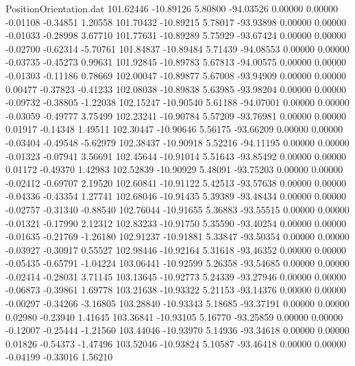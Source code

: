\begin{filecontents}{PositionOrientation.dat}
 101.62446  -10.89126    5.80800   -94.03526    0.00000    0.00000   -0.01108   -0.34851    1.20558
 101.70432  -10.89215    5.78017   -93.93898    0.00000    0.00000   -0.01033   -0.28998    3.67710
 101.77631  -10.89289    5.75929   -93.67424    0.00000    0.00000   -0.02700   -0.62314   -5.70761
 101.84837  -10.89484    5.71439   -94.08553    0.00000    0.00000   -0.03735   -0.45273    0.99631
 101.92845  -10.89783    5.67813   -94.00575    0.00000    0.00000   -0.01303   -0.11186    0.78669
 102.00047  -10.89877    5.67008   -93.94909    0.00000    0.00000    0.00477   -0.37823   -0.41233
 102.08038  -10.89838    5.63985   -93.98204    0.00000    0.00000   -0.09732   -0.38805   -1.22038
 102.15247  -10.90540    5.61188   -94.07001    0.00000    0.00000   -0.03059   -0.49777    3.75499
 102.23241  -10.90784    5.57209   -93.76981    0.00000    0.00000    0.01917   -0.14348    1.49511
 102.30447  -10.90646    5.56175   -93.66209    0.00000    0.00000   -0.03404   -0.49548   -5.62979
 102.38437  -10.90918    5.52216   -94.11195    0.00000    0.00000   -0.01323   -0.07941    3.56691
 102.45644  -10.91014    5.51643   -93.85492    0.00000    0.00000    0.01172   -0.49370    1.42983
 102.52839  -10.90929    5.48091   -93.75203    0.00000    0.00000   -0.02412   -0.69707    2.19520
 102.60841  -10.91122    5.42513   -93.57638    0.00000    0.00000   -0.04336   -0.43354    1.27741
 102.68046  -10.91435    5.39389   -93.48434    0.00000    0.00000   -0.02757   -0.31340   -0.88540
 102.76044  -10.91655    5.36883   -93.55515    0.00000    0.00000   -0.01321   -0.17990    2.12312
 102.83233  -10.91750    5.35590   -93.40254    0.00000    0.00000   -0.01635   -0.21769   -1.26180
 102.91237  -10.91881    5.33847   -93.50354    0.00000    0.00000   -0.03927   -0.30917    0.55527
 102.98446  -10.92164    5.31618   -93.46352    0.00000    0.00000   -0.05435   -0.65791   -1.04224
 103.06441  -10.92599    5.26358   -93.54685    0.00000    0.00000   -0.02414   -0.28031    3.71145
 103.13645  -10.92773    5.24339   -93.27946    0.00000    0.00000   -0.06873   -0.39861    1.69778
 103.21638  -10.93322    5.21153   -93.14376    0.00000    0.00000   -0.00297   -0.34266   -3.16805
 103.28840  -10.93343    5.18685   -93.37191    0.00000    0.00000    0.02980   -0.23940    1.41645
 103.36841  -10.93105    5.16770   -93.25859    0.00000    0.00000   -0.12007   -0.25444   -1.21560
 103.44046  -10.93970    5.14936   -93.34618    0.00000    0.00000    0.01826   -0.54373   -1.47496
 103.52046  -10.93824    5.10587   -93.46418    0.00000    0.00000   -0.04199   -0.33016    1.56210

\end{filecontents}

